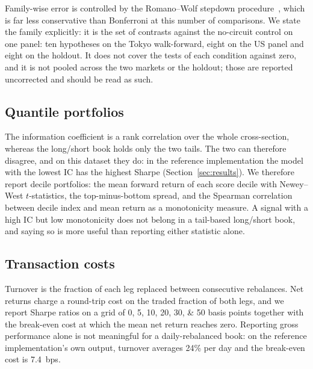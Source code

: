Family-wise error is controlled by the Romano--Wolf stepdown
procedure~\citep{romano2005stepwise}, which is far less conservative than
Bonferroni at this number of comparisons. We state the family explicitly: it is
the set of contrasts against the no-circuit control on one panel: ten
hypotheses on the Tokyo walk-forward, eight on the US panel and eight on the
holdout. It does not cover the tests of each condition against zero, and it is
not pooled across the two markets or the holdout; those are reported
uncorrected and should be read as such.

\subsection{Quantile portfolios}
\label{sec:protocol:quantiles}
The information coefficient is a rank correlation over the whole
cross-section, whereas the long/short book holds only the two tails. The two
can therefore disagree, and on this dataset they do: in the reference
implementation the model with the lowest IC has the highest Sharpe
(Section~\ref{sec:results}). We therefore report decile portfolios: the mean
forward return of each score decile with Newey--West $t$-statistics, the
top-minus-bottom spread, and the Spearman correlation between decile index and
mean return as a monotonicity measure. A signal with a high IC but low
monotonicity does not belong in a tail-based long/short book, and saying so is
more useful than reporting either statistic alone.

\subsection{Transaction costs}
\label{sec:protocol:costs}
Turnover is the fraction of each leg replaced between consecutive rebalances.
Net returns charge a round-trip cost on the traded fraction of both legs, and we
report Sharpe ratios on a grid of \numlist{0;5;10;20;30;50} basis points
together with the break-even cost at which the mean net return reaches zero.
Reporting gross performance alone is not meaningful for a daily-rebalanced
book: on the reference implementation's own output, turnover averages 24\% per
day and the break-even cost is \SI{7.4}{bps}.

